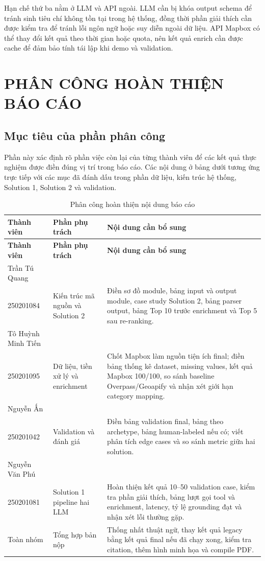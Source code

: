 \documentclass[a4paper,12pt]{article}
\begin{document}
Hạn chế thứ ba nằm ở LLM và API ngoài. LLM cần bị khóa output schema để tránh sinh tiêu chí không tồn tại trong hệ thống, đồng thời phần giải thích cần được kiểm tra để tránh lỗi ngôn ngữ hoặc suy diễn ngoài dữ liệu. API Mapbox có thể thay đổi kết quả theo thời gian hoặc quota, nên kết quả enrich cần được cache để đảm bảo tính tái lập khi demo và validation.

\section{PHÂN CÔNG HOÀN THIỆN BÁO CÁO}

\subsection{Mục tiêu của phần phân công}
Phần này xác định rõ phần việc còn lại của từng thành viên để các kết quả thực nghiệm được điền đúng vị trí trong báo cáo. Các nội dung ở bảng dưới tương ứng trực tiếp với các mục đã đánh dấu trong phần dữ liệu, kiến trúc hệ thống, Solution 1, Solution 2 và validation.

\begin{samepage}
\footnotesize
\setlength{\tabcolsep}{4pt}
\begin{xltabular}{\textwidth}{|P{4.1cm}|P{3.9cm}|Y|}
\caption{Phân công hoàn thiện nội dung báo cáo}
\label{tab:member_todo} \\
\hline
\textbf{Thành viên} & \textbf{Phần phụ trách} & \textbf{Nội dung cần bổ sung} \\ \hline
\endfirsthead
\hline
\textbf{Thành viên} & \textbf{Phần phụ trách} & \textbf{Nội dung cần bổ sung} \\ \hline
\endhead
Trần Tú Quang\\250201084 & Kiến trúc mã nguồn và Solution 2 & Điền sơ đồ module, bảng input và output module, case study Solution 2, bảng parser output, bảng Top 10 trước enrichment và Top 5 sau re-ranking. \\ \hline
Tô Huỳnh Minh Tiến\\250201095 & Dữ liệu, tiền xử lý và enrichment & Chốt Mapbox làm nguồn tiện ích final; điền bảng thống kê dataset, missing values, kết quả Mapbox 100/100, so sánh baseline Overpass/Geoapify và nhận xét giới hạn category mapping. \\ \hline
Nguyễn Ấn\\250201042 & Validation và đánh giá & Điền bảng validation final, bảng theo archetype, bảng human-labeled nếu có; viết phân tích edge cases và so sánh metric giữa hai solution. \\ \hline
Nguyễn Văn Phú\\250201081 & Solution 1 pipeline hai LLM & Hoàn thiện kết quả 10--50 validation case, kiểm tra phần giải thích, bảng lượt gọi tool và enrichment, latency, tỷ lệ grounding đạt và nhận xét lỗi thường gặp. \\ \hline
Toàn nhóm & Tổng hợp bản nộp & Thống nhất thuật ngữ, thay kết quả legacy bằng kết quả final nếu đã chạy xong, kiểm tra citation, thêm hình minh họa và compile PDF. \\ \hline
\end{xltabular}
\end{samepage}
\normalsize
\setlength{\tabcolsep}{6pt}
\end{document}
